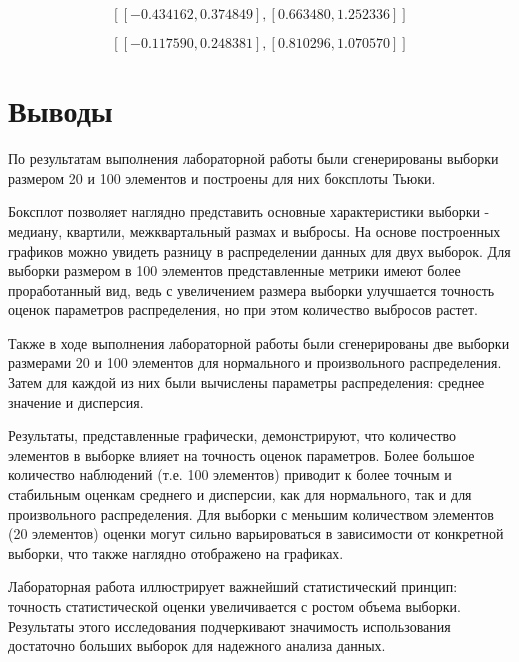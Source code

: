 \documentclass[12pt,a4paper]{article}
\begin{document}
	\vspace{12em}

	\[
		[[-0.434162, 0.374849], [0.663480, 1.252336]]
	\]

	\[
		[[-0.117590, 0.248381], [0.810296, 1.070570]]
	\]

	\vspace{10em}

	\section{Выводы}

	По результатам выполнения лабораторной работы были сгенерированы выборки
	размером 20 и 100 элементов и построены для них боксплоты Тьюки.

	Боксплот позволяет наглядно представить основные характеристики выборки
	- медиану, квартили, межквартальный размах и выбросы. На основе
	построенных графиков можно увидеть разницу в распределении данных для
	двух выборок. Для выборки размером в 100 элементов представленные
	метрики имеют более проработанный вид, ведь с увеличением размера
	выборки улучшается точность оценок параметров распределения, но при этом
	количество выбросов растет.

	Также в ходе выполнения лабораторной работы были сгенерированы две
	выборки размерами 20 и 100 элементов для нормального и произвольного
	распределения. Затем для каждой из них были вычислены параметры
	распределения: среднее значение и дисперсия.

	Результаты, представленные графически, демонстрируют, что количество
	элементов в выборке влияет на точность оценок параметров. Более большое
	количество наблюдений (т.е. 100 элементов) приводит к более точным и
	стабильным оценкам среднего и дисперсии, как для нормального, так и для
	произвольного распределения. Для выборки с меньшим количеством элементов
	(20 элементов) оценки могут сильно варьироваться в зависимости от
	конкретной выборки, что также наглядно отображено на графиках.

	Лабораторная работа иллюстрирует важнейший статистический принцип:
	точность статистической оценки увеличивается с ростом объема выборки.
	Результаты этого исследования подчеркивают значимость использования
	достаточно больших выборок для надежного анализа данных.
\end{document}
